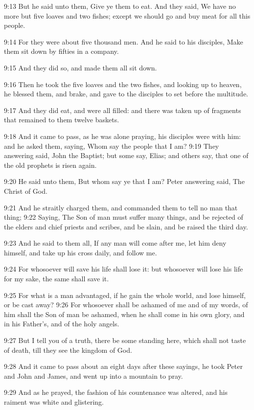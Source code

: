 9:13 But he said unto them, Give ye them to eat. And they said, We
have no more but five loaves and two fishes; except we should go and
buy meat for all this people.

9:14 For they were about five thousand men. And he said to his
disciples, Make them sit down by fifties in a company.

9:15 And they did so, and made them all sit down.

9:16 Then he took the five loaves and the two fishes, and looking up
to heaven, he blessed them, and brake, and gave to the disciples to
set before the multitude.

9:17 And they did eat, and were all filled: and there was taken up of
fragments that remained to them twelve baskets.

9:18 And it came to pass, as he was alone praying, his disciples were
with him: and he asked them, saying, Whom say the people that I am?
9:19 They answering said, John the Baptist; but some say, Elias; and
others say, that one of the old prophets is risen again.

9:20 He said unto them, But whom say ye that I am? Peter answering
said, The Christ of God.

9:21 And he straitly charged them, and commanded them to tell no man
that thing; 9:22 Saying, The Son of man must suffer many things, and
be rejected of the elders and chief priests and scribes, and be slain,
and be raised the third day.

9:23 And he said to them all, If any man will come after me, let him
deny himself, and take up his cross daily, and follow me.

9:24 For whosoever will save his life shall lose it: but whosoever
will lose his life for my sake, the same shall save it.

9:25 For what is a man advantaged, if he gain the whole world, and
lose himself, or be cast away?  9:26 For whosoever shall be ashamed of
me and of my words, of him shall the Son of man be ashamed, when he
shall come in his own glory, and in his Father's, and of the holy
angels.

9:27 But I tell you of a truth, there be some standing here, which
shall not taste of death, till they see the kingdom of God.

9:28 And it came to pass about an eight days after these sayings, he
took Peter and John and James, and went up into a mountain to pray.

9:29 And as he prayed, the fashion of his countenance was altered, and
his raiment was white and glistering.

